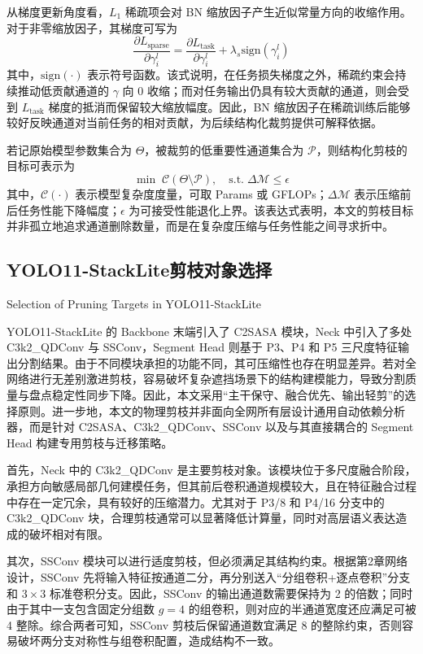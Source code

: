 从梯度更新角度看，$L_1$ 稀疏项会对 BN 缩放因子产生近似常量方向的收缩作用。对于非零缩放因子，其梯度可写为
\begin{equation}
\frac{\partial L_{\mathrm{sparse}}}{\partial \gamma_i^l}
=
\frac{\partial L_{\mathrm{task}}}{\partial \gamma_i^l}
+ \lambda_s \mathrm{sign}(\gamma_i^l)
\end{equation}
其中，$\mathrm{sign}(\cdot)$ 表示符号函数。该式说明，在任务损失梯度之外，稀疏约束会持续推动低贡献通道的 $\gamma$ 向 0 收缩；而对任务输出仍具有较大贡献的通道，则会受到 $L_{\mathrm{task}}$ 梯度的抵消而保留较大缩放幅度。因此，BN 缩放因子在稀疏训练后能够较好反映通道对当前任务的相对贡献，为后续结构化裁剪提供可解释依据。

若记原始模型参数集合为 $\Theta$，被裁剪的低重要性通道集合为 $\mathcal{P}$，则结构化剪枝的目标可表示为
\begin{equation}
\min \; \mathcal{C}(\Theta \setminus \mathcal{P}), \quad
\text{s.t.}\;\Delta \mathcal{M} \le \epsilon
\end{equation}
其中，$\mathcal{C}(\cdot)$ 表示模型复杂度度量，可取 Params 或 GFLOPs；$\Delta \mathcal{M}$ 表示压缩前后任务性能下降幅度；$\epsilon$ 为可接受性能退化上界。该表达式表明，本文的剪枝目标并非孤立地追求通道删除数量，而是在复杂度压缩与任务性能之间寻求折中。

\subsection{YOLO11-StackLite剪枝对象选择}{Selection of Pruning Targets in YOLO11-StackLite}

YOLO11-StackLite 的 Backbone 末端引入了 C2SASA 模块，Neck 中引入了多处 C3k2\_QDConv 与 SSConv，Segment Head 则基于 P3、P4 和 P5 三尺度特征输出分割结果。由于不同模块承担的功能不同，其可压缩性也存在明显差异。若对全网络进行无差别激进剪枝，容易破坏复杂遮挡场景下的结构建模能力，导致分割质量与盘点稳定性同步下降。因此，本文采用“主干保守、融合优先、输出轻剪”的选择原则。进一步地，本文的物理剪枝并非面向全网所有层设计通用自动依赖分析器，而是针对 C2SASA、C3k2\_QDConv、SSConv 以及与其直接耦合的 Segment Head 构建专用剪枝与迁移策略。

首先，Neck 中的 C3k2\_QDConv 是主要剪枝对象。该模块位于多尺度融合阶段，承担方向敏感局部几何建模任务，但其前后卷积通道规模较大，且在特征融合过程中存在一定冗余，具有较好的压缩潜力。尤其对于 P3/8 和 P4/16 分支中的 C3k2\_QDConv 块，合理剪枝通常可以显著降低计算量，同时对高层语义表达造成的破坏相对有限。

其次，SSConv 模块可以进行适度剪枝，但必须满足其结构约束。根据第2章网络设计，SSConv 先将输入特征按通道二分，再分别送入“分组卷积+逐点卷积”分支和 $3\times3$ 标准卷积分支。因此，SSConv 的输出通道数需要保持为 2 的倍数；同时由于其中一支包含固定分组数 $g=4$ 的组卷积，则对应的半通道宽度还应满足可被 4 整除。综合两者可知，SSConv 剪枝后保留通道数宜满足 8 的整除约束，否则容易破坏两分支对称性与组卷积配置，造成结构不一致。

